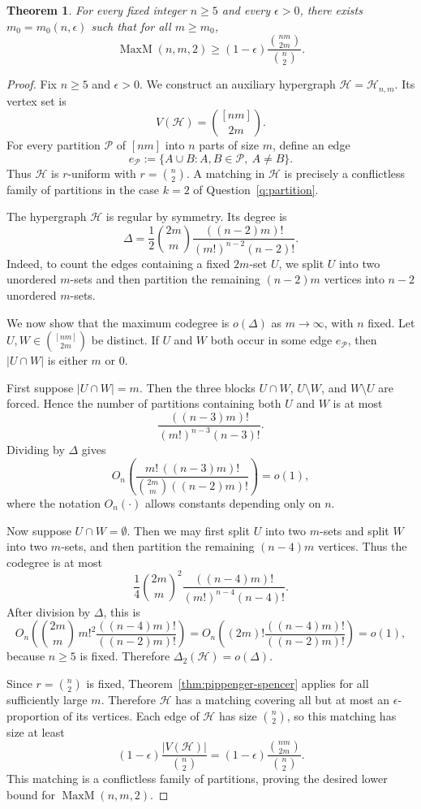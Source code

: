 \documentclass[12pt,UKenglish]{amsart}
\newtheorem{thm}{Theorem}[section]
\theoremstyle{plain}
\theoremstyle{definition}
\theoremstyle{remark}
\begin{document}
\begin{thm}\label{thm:maxm-fixed-n-large-m}
For every fixed integer $n\ge5$ and every $\epsilon>0$, there exists $m_0=m_0(n,\epsilon)$ such that for all $m\ge m_0$,
\[
\operatorname{MaxM}(n,m,2)
\ge
(1-\epsilon)\frac{\binom{nm}{2m}}{\binom n2}.
\]
\end{thm}
\begin{proof}
Fix $n\ge5$ and $\epsilon>0$. We construct an auxiliary hypergraph $\mathcal H=\mathcal H_{n,m}$. Its vertex set is
\[
V(\mathcal H)=\binom{[nm]}{2m}.
\]
For every partition $\mathcal P$ of $[nm]$ into $n$ parts of size $m$, define an edge
\[
e_{\mathcal P}:=\{A\cup B:A,B\in\mathcal P,\ A\neq B\}.
\]
Thus $\mathcal H$ is $r$-uniform with $r=\binom n2$. A matching in $\mathcal H$ is precisely a conflictless family of partitions in the case $k=2$ of Question~\ref{q:partition}.

The hypergraph $\mathcal H$ is regular by symmetry. Its degree is
\[
\Delta
=
\frac12\binom{2m}{m}
\frac{((n-2)m)!}{(m!)^{n-2}(n-2)!}.
\]
Indeed, to count the edges containing a fixed $2m$-set $U$, we split $U$ into two unordered $m$-sets and then partition the remaining $(n-2)m$ vertices into $n-2$ unordered $m$-sets.

We now show that the maximum codegree is $o(\Delta)$ as $m\to\infty$, with $n$ fixed. Let $U,W\in\binom{[nm]}{2m}$ be distinct. If $U$ and $W$ both occur in some edge $e_{\mathcal P}$, then $|U\cap W|$ is either $m$ or $0$.

First suppose $|U\cap W|=m$. Then the three blocks $U\cap W$, $U\setminus W$, and $W\setminus U$ are forced. Hence the number of partitions containing both $U$ and $W$ is at most
\[
\frac{((n-3)m)!}{(m!)^{n-3}(n-3)!}.
\]
Dividing by $\Delta$ gives
\[
O_n\!\left(
\frac{m!\,((n-3)m)!}{\binom{2m}{m}((n-2)m)!}
\right)=o(1),
\]
where the notation $O_n(\cdot)$ allows constants depending only on $n$.

Now suppose $U\cap W=\emptyset$. Then we may first split $U$ into two $m$-sets and split $W$ into two $m$-sets, and then partition the remaining $(n-4)m$ vertices. Thus the codegree is at most
\[
\frac14\binom{2m}{m}^2
\frac{((n-4)m)!}{(m!)^{n-4}(n-4)!}.
\]
After division by $\Delta$, this is
\[
O_n\!\left(
\binom{2m}{m}\,m!^2\frac{((n-4)m)!}{((n-2)m)!}
\right)
=
O_n\!\left(
(2m)!\frac{((n-4)m)!}{((n-2)m)!}
\right)=o(1),
\]
because $n\ge5$ is fixed. Therefore $\Delta_2(\mathcal H)=o(\Delta)$.

Since $r=\binom n2$ is fixed, Theorem~\ref{thm:pippenger-spencer} applies for all sufficiently large $m$. Therefore $\mathcal H$ has a matching covering all but at most an $\epsilon$-proportion of its vertices. Each edge of $\mathcal H$ has size $\binom n2$, so this matching has size at least
\[
(1-\epsilon)\frac{|V(\mathcal H)|}{\binom n2}
=
(1-\epsilon)\frac{\binom{nm}{2m}}{\binom n2}.
\]
This matching is a conflictless family of partitions, proving the desired lower bound for $\operatorname{MaxM}(n,m,2)$.
\end{proof}
\end{document}
